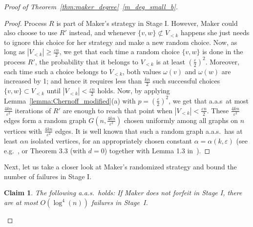 \documentclass[11pt, a4paper]{article}
\numberwithin{equation}{section}
\numberwithin{figure}{section}
\newtheorem{claim}[theorem]{Claim}
\begin{document}
\begin{proof}[Proof of Theorem~\ref{thm:maker_degree}~\ref{m_deg_small_b}]
\begin{proof}
Process $R$ is part of Maker's strategy in Stage I.
However, Maker could also choose to use $R'$
instead, and whenever $\{v,w\}\not\subset V_{<k}$
happens she just needs to ignore this choice for her strategy
and make a new random choice.
Now, as long as $|V_{<k}|\geq \frac{\varepsilon n}{2}$, 
we get that each time a random choice $\{v,w\}$
is done in the process $R'$, 
the probability that it belongs to $V_{<k}$ is at least 
$(\frac{\varepsilon}{2})^2$.
Moreover, each time such a choice belongs to 
$V_{<k}$, both values $\omega(v)$ and $\omega(w)$
are increased by 1; and hence it requires less than
$\frac{kn}{2}$ such successful choices 
$\{v,w\} \subset V_{<k}$ until 
$|V_{<k}| < \frac{\varepsilon n}{2}$ holds.
Now, by applying Lemma~\ref{lemma:Chernoff_modified}(a) with $p=(\frac{\varepsilon}{2})^2$,
we get that a.a.s~at most $\frac{4kn}{\varepsilon^2}$ 
iterations of $R'$ are enough
to reach that point when $|V_{<k}| < \frac{\varepsilon n}{2}$.
These $\frac{4kn}{\varepsilon^2}$ edges form a random graph 
$G(n,\frac{4kn}{\varepsilon^2})$ chosen uniformly among 
all graphs on $n$ vertices with $\frac{4kn}{\varepsilon^2}$ edges.
It is well known that such a random graph a.a.s.~has at least 
$\alpha n$ isolated vertices,
for an appropriately chosen constant 
$\alpha=\alpha(k,\varepsilon)$
(see e.g.~\cite{bollobas1998random}, or Theorem 3.3 (with $d=0$) together with Lemma 1.3 in~\cite{frieze2015introduction}).
\end{proof}
	

Next, let us take a closer look at Maker's randomized strategy and bound the number of failures in Stage I. 
	
	
	\begin{claim}
	The following a.a.s.~holds: If Maker does not forfeit 
	in Stage I, there are at most $O(\log^4(n))$ 
	failures in Stage~I.
	\end{claim}
	

\end{proof}
\end{document}
